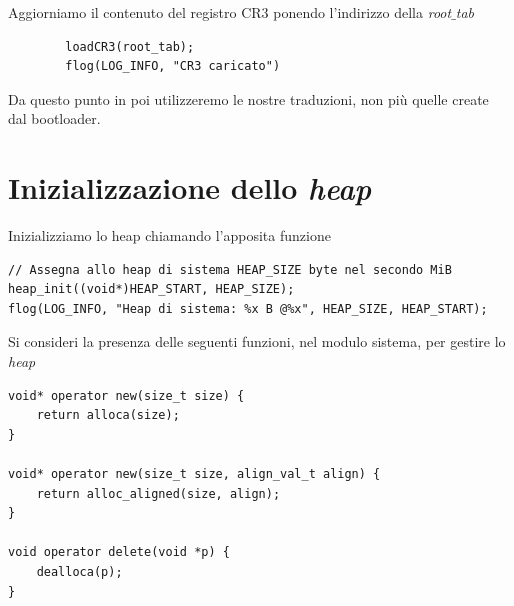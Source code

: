 \documentclass[11pt]{report}
\theoremstyle{definition}
\begin{document}
	Aggiorniamo il contenuto del registro CR3 ponendo l'indirizzo della \emph{root$\_$tab}
	\begin{verbatim}
		loadCR3(root_tab);
		flog(LOG_INFO, "CR3 caricato")
	\end{verbatim}
	Da questo punto in poi utilizzeremo le nostre traduzioni, non più quelle create dal bootloader.
	
\clearpage 

\section{Inizializzazione dello \emph{heap}}
Inizializziamo lo heap chiamando l'apposita funzione
\small 
\begin{verbatim}
// Assegna allo heap di sistema HEAP_SIZE byte nel secondo MiB
heap_init((void*)HEAP_START, HEAP_SIZE);
flog(LOG_INFO, "Heap di sistema: %x B @%x", HEAP_SIZE, HEAP_START);
\end{verbatim}
\normalsize 
Si consideri la presenza delle seguenti funzioni, nel modulo sistema, per gestire lo \emph{heap}
\begin{verbatim}
void* operator new(size_t size) {
    return alloca(size);
}

void* operator new(size_t size, align_val_t align) {
    return alloc_aligned(size, align);
}

void operator delete(void *p) {
    dealloca(p);
}
\end{verbatim}
\end{document}
